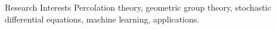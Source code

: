 \begin{rubric}{Research Interests}
\entry*[] Percolation theory, geometric group theory, stochastic differential equations, machine learning, applications.
\end{rubric}
